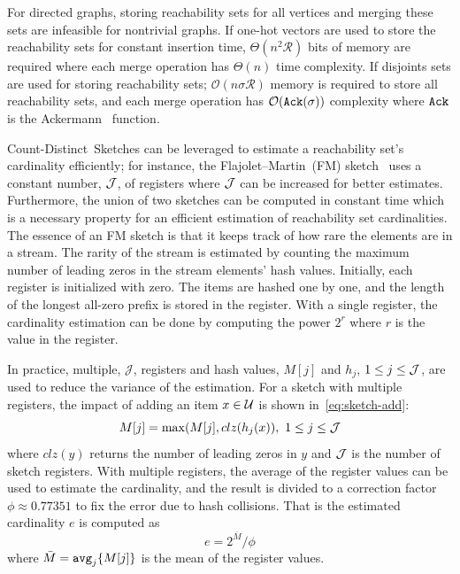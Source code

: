 \documentclass[final,5p,times,twocolumn]{elsarticle}
\newcommand\kktodo[1]{\textcolor{red}{#1}}
\newcommand\ggx[1]{\textcolor{blue}{#1}}
\begin{document}
For directed graphs, storing reachability sets for all vertices and merging these sets are infeasible for nontrivial graphs. 
If one-hot vectors are used to store the reachability sets for constant insertion time, $\Theta(n^2\mathcal{R})$ bits of memory are required where each merge operation has $\Theta(n)$ time complexity. 
If disjoints sets are used for storing reachability sets; $\mathcal{O}(n{\sigma}\mathcal{R})$ 
memory is required to store all reachability sets, and each merge operation has $\mathcal{O}({\tt Ack}(\sigma))$ complexity where ${\tt Ack}$ is the Ackermann~\cite{ackermann} function. %


Count-Distinct~Sketches can be leveraged to estimate a reachability set's cardinality efficiently; for instance, the Flajolet–Martin~(FM) sketch~\cite{flajolet1985probabilistic} uses a constant number, ${\cal J}$, of registers where ${\cal J}$ can be increased for better estimates. Furthermore, the union of two sketches can be computed in constant time which is a necessary property for an efficient estimation of reachability set cardinalities. The essence of an FM sketch is that it keeps track of how rare the elements are in a stream. The rarity of the stream is estimated by counting the maximum number of leading zeros in the stream elements' hash values. Initially, each register is initialized with zero. The items are hashed one by one, and the length of the longest all-zero prefix is stored in the register. With a single register, the cardinality estimation can be done by computing the power $2^r$ where $r$ is the value in the register.

In practice, multiple, ${\mathcal J}$, registers and hash values, $M[j]$ and $h_j$, $1 \leq j \leq {\cal J}$, are used to reduce the variance of the estimation. For a sketch with multiple registers, the impact of adding an item $x \in \cal{U}$ is shown in~\eqref{eq:sketch-add}:
\begin{equation}
    \label{eq:sketch-add}
    M[j] = \max(M[j], clz(h_j(x)),~1 \leq j \leq {\cal J}
\end{equation} where $clz(y)$ returns the number of leading zeros in $y$ and ${\cal J}$ is the number of sketch registers. With multiple registers, the average of the register values can be used to estimate the cardinality, and the result is divided to a correction factor $\phi \approx 0.77351$ to fix the error due to hash collisions. That is the estimated cardinality $e$ is computed as
\begin{equation}
    \label{eq:sketch-estimate}
    e = 2^{\bar{M}}/\phi
\end{equation} 
where $\bar{M} = {\tt{avg}}_j\{M[j]\}$ is the mean of the register values.
\end{document}
